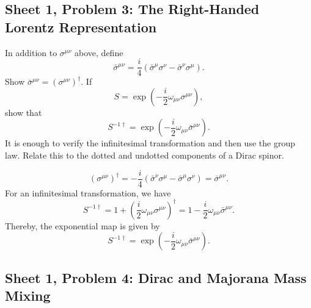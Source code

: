 \subsection{Sheet 1, Problem 3: The Right-Handed Lorentz Representation}

In addition to $\sigma^{\mu\nu}$ above, define
\begin{equation}
    \bar\sigma^{\mu\nu}
    =\frac i4(\bar\sigma^\mu\sigma^\nu
    -\bar\sigma^\nu\sigma^\mu).
\end{equation}
Show $\bar\sigma^{\mu\nu}=(\sigma^{\mu\nu})^\dagger$.
If
\begin{equation}
    S=\exp\!\left(-\frac i2\omega_{\mu\nu}
    \sigma^{\mu\nu}\right),
\end{equation}
show that
\begin{equation}
    S^{-1\dagger}
    =\exp\!\left(-\frac i2\omega_{\mu\nu}
    \bar\sigma^{\mu\nu}\right).
\end{equation}
It is enough to verify the infinitesimal transformation and then use
the group law. Relate this to the dotted and undotted components
of a Dirac spinor.
\begin{solution}
    \begin{equation}
        (\sigma^{\mu\nu})^\dagger = -\frac{i}{4}(\bar\sigma^\nu \sigma^\mu - \bar \sigma^\mu \sigma^\nu) = \bar \sigma^{\mu\nu}.
    \end{equation}
    For an infinitesimal transformation, we have
    \begin{equation}
        S^{-1\dagger} = 1 +\left(\frac{i}{2}\omega_{\mu\nu}\sigma^{\mu\nu}\right)^\dagger = 1 - \frac{i}{2}\omega_{\mu\nu}\bar \sigma^{\mu\nu}.
    \end{equation}
    Thereby, the exponential map is given by
    \begin{equation}
            S^{-1\dagger}
    =\exp\!\left(-\frac i2\omega_{\mu\nu}
    \bar\sigma^{\mu\nu}\right).
    \end{equation}
\end{solution}

\subsection{Sheet 1, Problem 4: Dirac and Majorana Mass Mixing}

